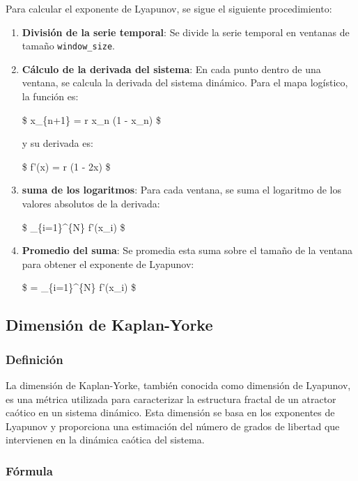 \documentclass[11pt]{article}
\begin{document}
Para calcular el exponente de Lyapunov, se sigue el siguiente
procedimiento:

\begin{enumerate}
\def\labelenumi{\arabic{enumi}.}
\item
  \textbf{División de la serie temporal}: Se divide la serie temporal en
  ventanas de tamaño \texttt{window\_size}.
\item
  \textbf{Cálculo de la derivada del sistema}: En cada punto dentro de
  una ventana, se calcula la derivada del sistema dinámico. Para el mapa
  logístico, la función es:

  \$ x\_\{n+1\} = r x\_n (1 - x\_n) \$

  y su derivada es:

  \$ f'(x) = r (1 - 2x) \$
\item
  \textbf{suma de los logaritmos}: Para cada ventana, se suma el
  logaritmo de los valores absolutos de la derivada:

  \$ \sum\_\{i=1\}\^{}\{N\} \log \left\textbar{} f'(x\_i)
  \right\textbar{} \$
\item
  \textbf{Promedio del suma}: Se promedia esta suma sobre el tamaño de
  la ventana para obtener el exponente de Lyapunov:

  \$ \lambda =  \sum\_\{i=1\}\^{}\{N\} \log \left\textbar{}
  f'(x\_i) \right\textbar{} \$
\end{enumerate}

\hypertarget{dimensiuxf3n-de-kaplan-yorke}{%
\subsection{Dimensión de
Kaplan-Yorke}\label{dimensiuxf3n-de-kaplan-yorke}}

\hypertarget{definiciuxf3n-1}{%
\subsubsection{Definición}\label{definiciuxf3n-1}}

La dimensión de Kaplan-Yorke, también conocida como dimensión de
Lyapunov, es una métrica utilizada para caracterizar la estructura
fractal de un atractor caótico en un sistema dinámico. Esta dimensión se
basa en los exponentes de Lyapunov y proporciona una estimación del
número de grados de libertad que intervienen en la dinámica caótica del
sistema.

\hypertarget{fuxf3rmula}{%
\subsubsection{Fórmula}\label{fuxf3rmula}}
\end{document}
